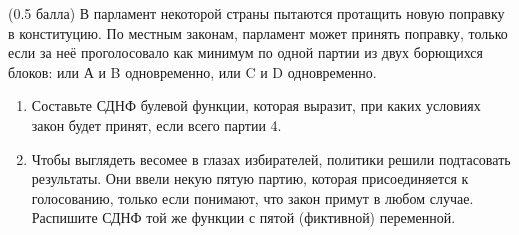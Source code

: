 \question
(0.5 балла) В парламент некоторой страны пытаются протащить новую поправку в конституцию. По местным законам, парламент может принять поправку, только если за неё проголосовало как минимум по одной партии из двух борющихся блоков: или А и B одновременно, или C и D одновременно.

\begin{enumerate}
    \item Составьте СДНФ булевой функции, которая выразит, при каких условиях закон будет принят, если всего партии 4.
    \item Чтобы выглядеть весомее в глазах избирателей, политики решили подтасовать результаты.  Они ввели некую пятую партию, которая присоединяется к голосованию, только если понимают, что закон примут в любом случае. Распишите СДНФ той же функции с пятой (фиктивной) переменной.
\end{enumerate}